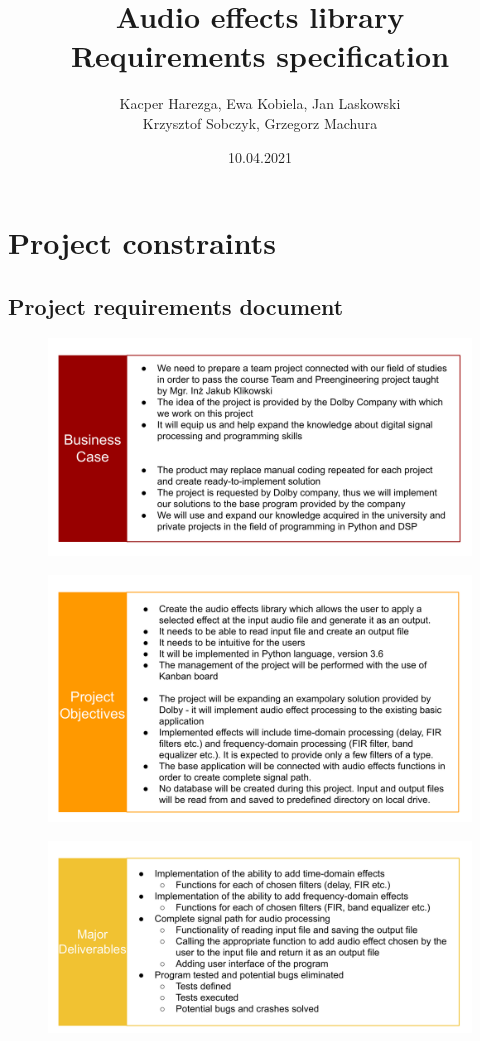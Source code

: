 \documentclass[12pt]{article}
\title{Audio effects library\\Requirements specification}
\author{Kacper Harezga, Ewa Kobiela, Jan Laskowski\\Krzysztof Sobczyk, Grzegorz Machura}
\date{10.04.2021}
\begin{document}
	
	\maketitle
	\tableofcontents
	\newpage
	
\section{Project constraints}

\subsection{Project requirements document}	
	
	\begin{figure}[H]
		\includegraphics[width=1\textwidth, center]{Business Case Expanded}
	\end{figure}
	
	\begin{figure}[H]
		\includegraphics[width=1\textwidth, center]{Project Objectives Expanded}
	\end{figure}
	
	\begin{figure}[H]
		\includegraphics[width=1\textwidth, center]{Major Deliverables}
	\end{figure}
	
\end{document}

